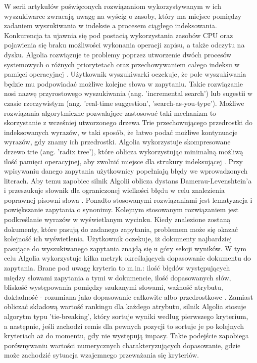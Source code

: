 W serii artykułów poświęconych rozwiązaniom
wykorzystywanym w ich wyszukiwarce zwracają uwagę na wyścig o zasoby, który ma miejsce
pomiędzy zadaniem wyszukiwania w indeksie a procesem ciągłego indeksowania. Konkurencja ta ujawnia się pod postacią wykorzystania zasobów CPU oraz pojawienia się braku
możliwości wykonania operacji zapisu, a także odczytu na dysku. Algolia rozwiązuje te problemy poprzez
utworzenie dwóch procesów systemowych o różnych priorytetach oraz przechowywaniem całego
indeksu w pamięci operacyjnej \autocite[a]{insidealgoliapart-a}. Użytkownik wyszukiwarki oczekuje, że pole wyszukiwania
będzie mu podpowiadać możliwe kolejne słowa w zapytaniu. Takie rozwiązanie nosi nazwę
przyrostowego wyszukiwania (ang. 'incremental search') lub sugestii w czasie rzeczywistym (ang. 'real-time suggestion', 'search-as-you-type').
Możliwe rozwiązania algorytmiczne pozwalające zastosować taki mechanizm to skorzystanie z
wcześniej utworzonego drzewa Trie przechowującego przedrostki do indeksowanych wyrazów, w taki
sposób, że łatwo podać możliwe kontynuacje wyrazów, gdy znamy ich przedrostki. Algolia wykorzystuje
skompresowane drzewo trie (ang. 'radix tree'), które oblicza wykorzystując minimalną możliwą ilość
pamięci operacyjnej, aby zwolnić miejsce dla strukury indeksującej \autocite{insidealgoliapart-b}. Przy wpisywaniu danego
zapytania użytkownicy popełniają błędy we wprowadzonych literach. Aby temu zapobiec silnik Algolii
oblicza dystans Damerau-Levenshtein'a i przeszukuje słownik dla ograniczonej wielkości błędu w celu znalezienia poprawnej pisowni słowa \autocite
{insidealgoliapart-c}. Ponadto stosowanymi rozwiązaniami jest lematyzacja i
powiększanie zapytania o synonimy. Kolejnym stosowanym rozwiązaniem jest podkreślanie wyrazów
w wyświetlanym wycinku.
Kiedy znalezione zostaną dokumenty, które pasują do zadanego zapytania, problemem może
się okazać kolejność ich wyświetlenia. Użytkownik oczekuje, iż dokumenty najbardziej pasujące do
wyszukiwanego zapytania znajdą się u góry sekcji wyników. W tym celu Algolia wykorzystuje kilka metryk
określających dopasowanie dokumentu do zapytania. Brane pod uwagę kryteria to m.in.: ilość błędów występujących
między słowami zapytania a tymi w dokumencie, ilość dopasowanych słów, bliskość występowania
pomiędzy szukanymi słowami, ważność atrybutu, dokładność - rozumiana jako dopasowanie całkowite
albo przedrostkowe \autocite{insidealgoliapart-d}. Zamiast obliczać składową wartość rankingu dla każdego atrybutu, silnik Algolia
stosuje algorytm typu 'tie-breaking', który sortuje wyniki według pierwszego kryterium, a następnie, jeśli
zachodzi remis dla pewnych pozycji to sortuje je po kolejnych kryteriach aż do momentu, gdy nie
występują impasy. Takie podejście zapobiega porównywaniu wartości numerycznych charakteryzujących dopasowanie, gdzie
może zachodzić sytuacja wzajemnego przeważania się kryteriów.

